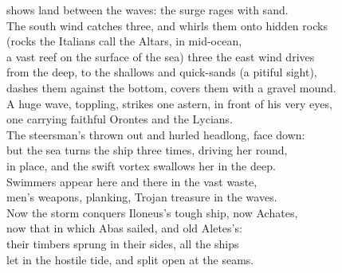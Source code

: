 \documentclass[10pt, a5paper, titlepage]{minimal}
\begin{document}
shows land between the waves: the surge rages with sand.\\
The south wind catches three, and whirls them onto hidden rocks\\
(rocks the Italians call the Altars, in mid-ocean,\\
a vast reef on the surface of the sea) three the east wind drives\\
from the deep, to the shallows and quick-sands (a pitiful sight),\\
dashes them against the bottom, covers them with a gravel mound.\\
A huge wave, toppling, strikes one astern, in front of his very eyes,\\
one carrying faithful Orontes and the Lycians.\\
The steersman's thrown out and hurled headlong, face down:\\
but the sea turns the ship three times, driving her round,\\
in place, and the swift vortex swallows her in the deep.\\
Swimmers appear here and there in the vast waste,\\
men's weapons, planking, Trojan treasure in the waves.\\
Now the storm conquers Iloneus's tough ship, now Achates,\\
now that in which Abas sailed, and old Aletes's:\\
their timbers sprung in their sides, all the ships\\
let in the hostile tide, and split open at the seams.
\end{document}

